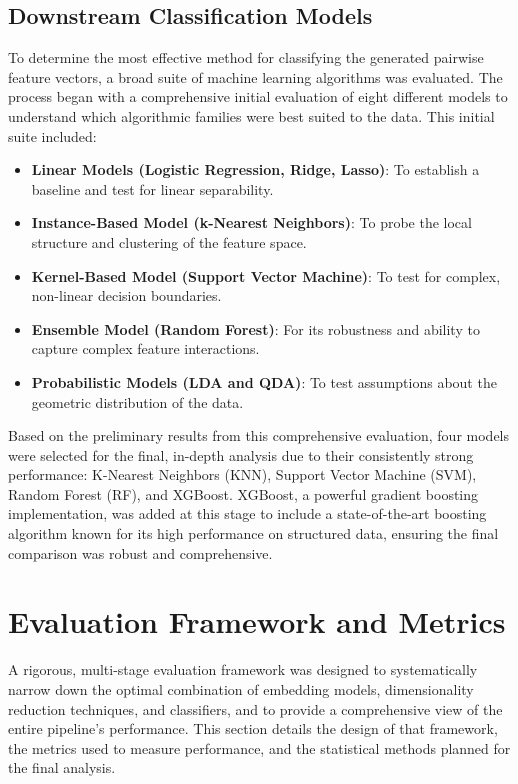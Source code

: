 \subsection{Downstream Classification Models}\label{ch:3.3.2}
To determine the most effective method for classifying the generated pairwise feature vectors, a broad suite of machine learning algorithms was evaluated. The process began with a comprehensive initial evaluation of eight different models to understand which algorithmic families were best suited to the data. This initial suite included:
\begin{itemize}
    \item \textbf{Linear Models (Logistic Regression, Ridge, Lasso)}: To establish a baseline and test for linear separability.
    \item \textbf{Instance-Based Model (k-Nearest Neighbors)}: To probe the local structure and clustering of the feature space.
    \item \textbf{Kernel-Based Model (Support Vector Machine)}: To test for complex, non-linear decision boundaries.
    \item \textbf{Ensemble Model (Random Forest)}: For its robustness and ability to capture complex feature interactions.
    \item \textbf{Probabilistic Models (LDA and QDA)}: To test assumptions about the geometric distribution of the data.
\end{itemize}
Based on the preliminary results from this comprehensive evaluation, four models were selected for the final, in-depth analysis due to their consistently strong performance: K-Nearest Neighbors (KNN), Support Vector Machine (SVM), Random Forest (RF), and XGBoost. XGBoost, a powerful gradient boosting implementation, was added at this stage to include a state-of-the-art boosting algorithm known for its high performance on structured data, ensuring the final comparison was robust and comprehensive.

\section{Evaluation Framework and Metrics}\label{ch:3.4}
A rigorous, multi-stage evaluation framework was designed to systematically narrow down the optimal combination of embedding models, dimensionality reduction techniques, and classifiers, and to provide a comprehensive view of the entire pipeline's performance. This section details the design of that framework, the metrics used to measure performance, and the statistical methods planned for the final analysis.

